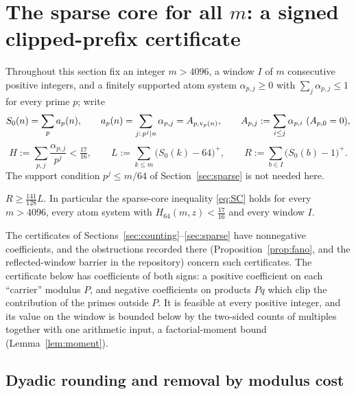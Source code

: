 \section{The sparse core for all $m$: a signed clipped-prefix certificate}\label{sec:signed}

Throughout this section fix an integer $m>4096$, a window $I$ of $m$ consecutive positive integers, and a finitely
supported atom system $\alpha_{p,j}\ge0$ with $\sum_j\alpha_{p,j}\le1$ for every prime $p$; write
\[
S_0(n)=\sum_pa_p(n),\qquad a_p(n)=\sum_{j:\,p^j\mid n}\alpha_{p,j}=A_{p,\operatorname{v}_p(n)},\qquad A_{p,j}:=\sum_{i\le j}\alpha_{p,i}\ (A_{p,0}=0),
\]
\[
H:=\sum_{p,j}\frac{\alpha_{p,j}}{p^j}<\tfrac{17}{16},\qquad L:=\sum_{k\le m}\bigl(S_0(k)-64\bigr)^+,\qquad R:=\sum_{b\in I}\bigl(S_0(b)-1\bigr)^+ .
\]
The support condition $p^j\le m/64$ of Section~\ref{sec:sparse} is not needed here.

\begin{theorem}\label{thm:signed}
$R\ge\tfrac{141}{128}L$. In particular the sparse-core inequality \eqref{eq:SC} holds for every $m>4096$, every atom system with
$H_{64}(m,z)<\tfrac{17}{16}$ and every window $I$.
\end{theorem}

The certificates of Sections~\ref{sec:counting}--\ref{sec:sparse} have nonnegative coefficients, and the obstructions recorded there
(Proposition~\ref{prop:fano}, and the reflected-window barrier in the repository) concern such certificates. The certificate below has
coefficients of both signs: a positive coefficient on each ``carrier'' modulus $P$, and negative coefficients on products $Pq$ which clip
the contribution of the primes outside $P$. It is feasible at every positive integer, and its value on the window is bounded below by the
two-sided counts of multiples together with one arithmetic input, a factorial-moment bound (Lemma~\ref{lem:moment}).

\subsection*{Dyadic rounding and removal by modulus cost}

